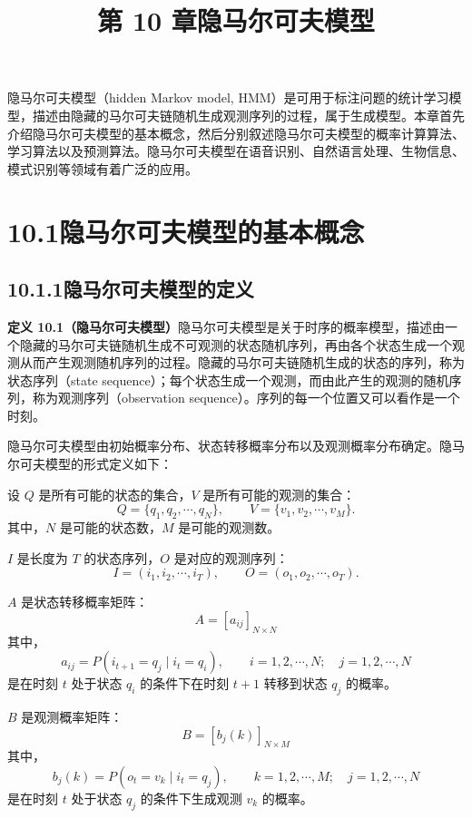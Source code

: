 \documentclass[UTF8, 12pt, fontset=fandol, oneside]{ctexart}
\title{第 10 章\quad 隐马尔可夫模型}
\author{}
\date{}
\begin{document}
\maketitle

隐马尔可夫模型（hidden Markov model, HMM）是可用于标注问题的统计学习模型，描述由隐藏的马尔可夫链随机生成观测序列的过程，属于生成模型。本章首先介绍隐马尔可夫模型的基本概念，然后分别叙述隐马尔可夫模型的概率计算算法、学习算法以及预测算法。隐马尔可夫模型在语音识别、自然语言处理、生物信息、模式识别等领域有着广泛的应用。

\section*{10.1\quad 隐马尔可夫模型的基本概念}

\subsection*{10.1.1\quad 隐马尔可夫模型的定义}

\noindent\textbf{定义 10.1（隐马尔可夫模型）}\quad 隐马尔可夫模型是关于时序的概率模型，描述由一个隐藏的马尔可夫链随机生成不可观测的状态随机序列，再由各个状态生成一个观测从而产生观测随机序列的过程。隐藏的马尔可夫链随机生成的状态的序列，称为状态序列（state sequence）；每个状态生成一个观测，而由此产生的观测的随机序列，称为观测序列（observation sequence）。序列的每一个位置又可以看作是一个时刻。

隐马尔可夫模型由初始概率分布、状态转移概率分布以及观测概率分布确定。隐马尔可夫模型的形式定义如下：

设 $Q$ 是所有可能的状态的集合，$V$ 是所有可能的观测的集合：
\[
  Q=\{q_1,q_2,\cdots,q_N\},\qquad
  V=\{v_1,v_2,\cdots,v_M\}.
\]
其中，$N$ 是可能的状态数，$M$ 是可能的观测数。

$I$ 是长度为 $T$ 的状态序列，$O$ 是对应的观测序列：
\[
  I=(i_1,i_2,\cdots,i_T),\qquad
  O=(o_1,o_2,\cdots,o_T).
\]

$A$ 是状态转移概率矩阵：
\begin{equation}
  A=[a_{ij}]_{N\times N}
  \tag{10.1}
\end{equation}
其中，
\begin{equation}
  a_{ij}=P(i_{t+1}=q_j\mid i_t=q_i),\qquad
  i=1,2,\cdots,N;\quad j=1,2,\cdots,N
  \tag{10.2}
\end{equation}
是在时刻 $t$ 处于状态 $q_i$ 的条件下在时刻 $t+1$ 转移到状态 $q_j$ 的概率。

$B$ 是观测概率矩阵：
\begin{equation}
  B=[b_j(k)]_{N\times M}
  \tag{10.3}
\end{equation}
其中，
\begin{equation}
  b_j(k)=P(o_t=v_k\mid i_t=q_j),\qquad
  k=1,2,\cdots,M;\quad j=1,2,\cdots,N
  \tag{10.4}
\end{equation}
是在时刻 $t$ 处于状态 $q_j$ 的条件下生成观测 $v_k$ 的概率。
\end{document}
